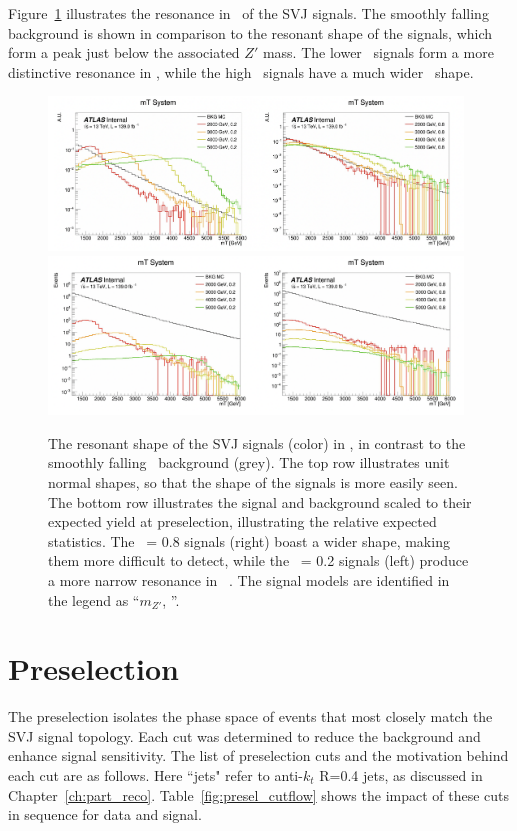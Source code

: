 Figure~\ref{fig:mt_mass} illustrates the resonance in \mt~of the SVJ signals. The smoothly falling background is shown in comparison to the resonant shape of the signals, which form a peak just below the associated $Z'$ mass. The lower \rinv~signals form a more distinctive resonance in \mt, while the high \rinv~signals have a much wider \mt~shape.
\begin{figure}[!htbp]
\centering
    \includegraphics[width=0.98\textwidth]{figures/ch8/mt_mass_norm}
    \includegraphics[width=0.98\textwidth]{figures/ch8/mt_mass_unnorm}
    \caption{The resonant shape of the SVJ signals (color) in \mt, in contrast to the smoothly falling \mt~background (grey). The top row illustrates unit normal shapes, so that the shape of the signals is more easily seen. The bottom row illustrates the signal and background scaled to their expected yield at preselection, illustrating the relative expected statistics. The \rinv~= 0.8 signals (right) boast a wider shape, making them more difficult to detect, while the \rinv~= 0.2 signals (left) produce a more narrow resonance in \mt~. The signal models are identified in the legend as ``$m_{Z'}$, \rinv''. 
    \label{fig:mt_mass}}
\end{figure}

\section{Preselection}
\label{sec:eventsel}

The preselection isolates the phase space of events that most closely match the SVJ signal topology. Each cut was determined to reduce the background and enhance signal sensitivity.
The list of preselection cuts and the motivation behind each cut are as follows. 
Here ``jets" refer to anti-$k_t$ R=0.4 jets, as discussed in Chapter~\ref{ch:part_reco}.
Table~\ref{fig:presel_cutflow} shows the impact of these cuts in sequence for data and signal.

